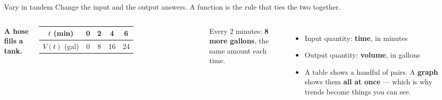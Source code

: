 \documentclass[aspectratio=169, 11pt]{beamer}
\begin{document}
\begin{frame}[t, plain]

  \begin{block}{Vary in tandem}
    Change the input and the output answers. A function is the rule that ties
    the two together.
  \end{block}

  \bigskip
  \begin{columns}[T]
      \textbf{A hose fills a tank.}

      \medskip
      \begin{tabular}{|c|c|c|c|c|}
      \hline
      \(t\) (min) & 0 & 2 & 4 & 6 \\
      \hline
      \(V(t)\) (gal) & 0 & 8 & 16 & 24 \\
      \hline
      \end{tabular}

      \medskip
      Every 2 minutes: \textbf{8 more gallons}, the same amount each time.

      \begin{itemize}\setlength{\itemsep}{7pt}
        \item Input quantity: \textbf{time}, in minutes
        \item Output quantity: \textbf{volume}, in gallons
        \item A table shows a handful of pairs. A \textbf{graph} shows them
              \textbf{all at once} --- which is why trends become things you
              can see.
      \end{itemize}
  \end{columns}
\end{frame}
\end{document}

